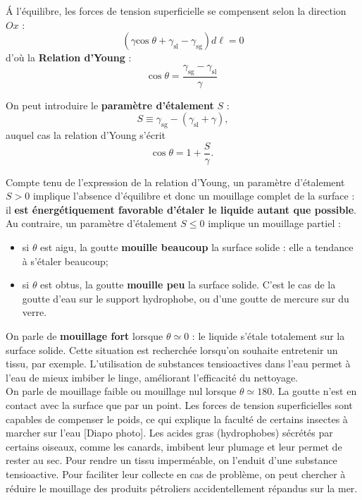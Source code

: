 \documentclass[11pt,a4paper]{report}
\begin{document}
\'A l'équilibre, les forces de tension superficielle se compensent selon la direction $Ox$ :
\begin{equation}
	\left(\gamma \text{cos}\;\theta + \gamma_\text{sl} - \gamma_\text{sg}\right) d\ell = 0
\end{equation}
d'où la \textbf{Relation d'Young} :
\begin{equation}
	\text{cos}\;\theta = \frac{\gamma_\text{sg} - \gamma_\text{sl}}{\gamma}
\end{equation}

On peut introduire le \textbf{paramètre d'étalement} $S$ :
\begin{equation}
	\boxed{S \equiv \gamma_\text{sg} - \left(\gamma_\text{sl} + \gamma\right)},
\end{equation}
auquel cas la relation d'Young s'écrit
\begin{equation}
	\boxed{\text{cos}\;\theta = 1 + \frac{S}{\gamma}}.
\end{equation}

Compte tenu de l'expression de la relation d'Young, un paramètre d'étalement $S > 0$ implique l'absence d'équilibre et donc un mouillage complet de la surface : il \textbf{est énergétiquement favorable d'étaler le liquide autant que possible}. Au contraire, un paramètre d'étalement $S \leq 0$ implique un mouillage partiel :
\begin{itemize}
	\item si $\theta$ est aigu, la goutte \textbf{mouille beaucoup} la surface solide : elle a tendance à s'étaler beaucoup;
	\item si $\theta$ est obtus, la goutte \textbf{mouille peu} la surface solide. C'est le cas de la goutte d'eau sur le support hydrophobe, ou d'une goutte de mercure sur du verre.\\ 
\end{itemize}

On parle de \textbf{mouillage fort} lorsque $\theta \simeq 0$ : le liquide s'étale totalement sur la surface solide. Cette situation est recherchée lorsqu'on souhaite entretenir un tissu, par exemple. L'utilisation de substances tensioactives dans l'eau permet à l'eau de mieux imbiber le linge, améliorant l'efficacité du nettoyage.\\

On parle de mouillage faible ou mouillage nul lorsque $\theta \simeq 180$. La goutte n'est en contact avec la surface que par un point. Les forces de tension superficielles sont capables de compenser le poids, ce qui explique la faculté de certains insectes à marcher sur l'eau [Diapo photo]. Les acides gras (hydrophobes) sécrétés par certains oiseaux, comme les canards, imbibent leur plumage et leur permet de rester au sec. Pour rendre un tissu imperméable, on l'enduit d'une substance tensioactive. Pour faciliter leur collecte en cas de problème, on peut chercher à réduire le mouillage des produits pétroliers accidentellement répandus sur la mer.\\
\end{document}
